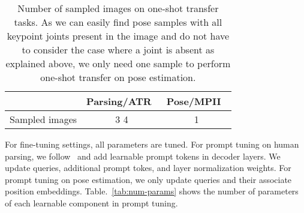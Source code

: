 \documentclass[10pt,twocolumn,letterpaper]{article}
\begin{document}
\begin{table}[htbp]
  \centering
  \footnotesize
  \caption{Number of sampled images on one-shot transfer tasks. As we can easily find pose samples with all keypoint joints present in the image and do not have to consider the case where a joint is absent as explained above, we only need one sample to perform one-shot transfer on pose estimation. }
    \begin{tabular}{lcc}
    \toprule
          & \multicolumn{1}{c}{Parsing/ATR~\cite{liang2015human}} & Pose/MPII~\cite{andriluka20142d} \\
          \midrule
    Sampled images & 3  4     & 1 \\
    \bottomrule
    \end{tabular}\label{tab:num-data-sample-one}\end{table}

 For fine-tuning settings, all parameters are tuned. For prompt tuning on human parsing, we follow~\cite{liu2021p,zhu2022uni} and add learnable prompt tokens in decoder layers. We update queries, additional prompt tokes, and layer normalization weights. For prompt tuning on pose estimation, we only update queries and their associate position embeddings. Table.~\ref{tab:num-params} shows the number of parameters of each learnable component in prompt tuning.

\begin{table}[htbp]
  \centering
  \caption{Number of tunable parameters for prompt tuning on human parsing, pose estimation, and pedestrian attribute recognition.}
  \label{tab:num-params}\end{table}
\end{document}
